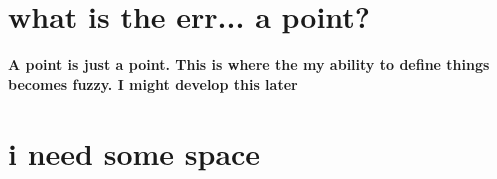 \documentclass[../main.tex]{subfiles}
\begin{document}
\section{what is the err... a point?}

\begin{definition}
  \label{def:point}

  \textbf{A point is just a point. This is where the my ability to define things becomes fuzzy. I might develop this later}

\end{definition}

\section{i need some space}

\pagebreak
\end{document}
